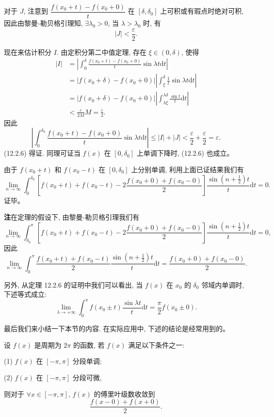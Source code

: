 \documentclass[UTF8,12pt,a4paper,fontset=fandol]{ctexart}
\begin{document}
对于 $J$, 注意到 $\dfrac{f(x_0+t)-f(x_0+0)}{t}$ 在 $[\delta,\delta_0]$ 上可积或有瑕点时绝对可积, 因此由黎曼-勒贝格引理知, $\exists\lambda_0>0$, 当 $\lambda>\lambda_0$ 时, 有
\[
  |J|<\frac{\varepsilon}{2}.
\]

现在来估计积分 $I$. 由定积分第二中值定理, 存在 $\xi\in(0,\delta)$, 使得
\[
\begin{aligned}
  |I|
  &=
  \left|\int_0^\delta\frac{f(x_0+t)-f(x_0+0)}{t}\sin\lambda t\mathrm dt\right|\\
  &=
  |f(x_0+\delta)-f(x_0+0)|
  \left|\int_\xi^\delta\frac1t\sin\lambda t\mathrm dt\right|\\
  &=
  |f(x_0+\delta)-f(x_0+0)|
  \left|\int_{\lambda\xi}^{\lambda\delta}\frac{\sin t}{t}\mathrm dt\right|\\
  &<
  \frac{\varepsilon}{2M}M=\frac{\varepsilon}{2}.
\end{aligned}
\]
因此
\[
  \left|\int_0^{\delta_0}\frac{f(x_0+t)-f(x_0+0)}{t}\sin\lambda t\mathrm dt\right|
  \leqslant |I|+|J|<\frac{\varepsilon}{2}+\frac{\varepsilon}{2}=\varepsilon.
\]
(12.2.6) 得证. 同理可证当 $f(x)$ 在 $[0,\delta_0]$ 上单调下降时, (12.2.6) 也成立。

由于 $f(x_0+t)$ 和 $f(x_0-t)$ 在 $[0,\delta_0]$ 上分别单调, 利用上面已证结果我们有
\[
  \lim_{n\to\infty}\int_0^{\delta_0}
  \left[
    f(x_0+t)+f(x_0-t)-2\frac{f(x_0+0)+f(x_0-0)}{2}
  \right]
  \frac{\sin\left(n+\frac12\right)t}{t}\mathrm dt=0.
\]
证毕。

\noindent\textbf{注}\quad 在定理的假设下, 由黎曼-勒贝格引理我们有
\[
  \lim_{n\to\infty}\int_{\delta_0}^\pi
  \left[
    f(x_0+t)+f(x_0-t)-2\frac{f(x_0+0)+f(x_0-0)}{2}
  \right]
  \frac{\sin\left(n+\frac12\right)t}{t}\mathrm dt=0,
\]
因此
\[
  \lim_{n\to\infty}\int_0^\pi
  \frac{f(x_0+t)+f(x_0-t)}{2}
  \frac{\sin\left(n+\frac12\right)t}{t}\mathrm dt
  =
  \frac{f(x_0+0)+f(x_0-0)}{2}.
\]

另外, 从定理 12.2.6 的证明中我们可以看出, 当 $f(x)$ 在 $x_0$ 的 $\delta_0$ 邻域内单调时, 下述等式成立:
\[
  \lim_{\lambda\to+\infty}\int_0^\pi f(x_0\pm t)\frac{\sin\lambda t}{t}\mathrm dt
  =\frac{\pi}{2}f(x_0\pm0).
\]

最后我们来小结一下本节的内容. 在实际应用中, 下述的结论是经常用到的。

设 $f(x)$ 是周期为 $2\pi$ 的函数, 若 $f(x)$ 满足以下条件之一:

(1) $f(x)$ 在 $[-\pi,\pi]$ 分段单调;

(2) $f(x)$ 在 $[-\pi,\pi]$ 分段可微,

则对于 $\forall x\in[-\pi,\pi]$, $f(x)$ 的傅里叶级数收敛到
\[
  \frac{f(x-0)+f(x+0)}{2}.
\]
\end{document}
